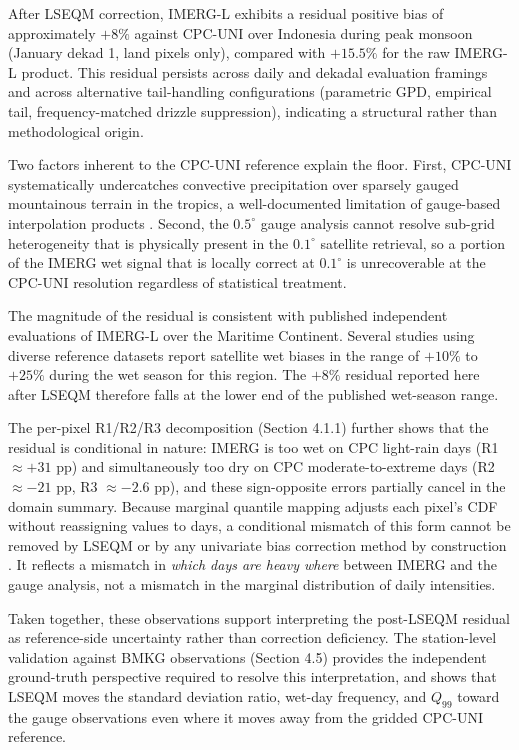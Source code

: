 \documentclass[
]{article}
\begin{document}
After LSEQM correction, IMERG-L exhibits a residual positive bias of
approximately \(+8\%\) against CPC-UNI over Indonesia during peak
monsoon (January dekad 1, land pixels only), compared with \(+15.5\%\)
for the raw IMERG-L product. This residual persists across daily and
dekadal evaluation framings and across alternative tail-handling
configurations (parametric GPD, empirical tail, frequency-matched
drizzle suppression), indicating a structural rather than methodological
origin.

Two factors inherent to the CPC-UNI reference explain the floor. First,
CPC-UNI systematically undercatches convective precipitation over
sparsely gauged mountainous terrain in the tropics, a well-documented
limitation of gauge-based interpolation products \cite{ref36,ref37}. Second,
the \(0.5^{\circ}\) gauge analysis cannot resolve sub-grid heterogeneity
that is physically present in the \(0.1^{\circ}\) satellite retrieval,
so a portion of the IMERG wet signal that is locally correct at
\(0.1^{\circ}\) is unrecoverable at the CPC-UNI resolution regardless of
statistical treatment.

The magnitude of the residual is consistent with published independent
evaluations of IMERG-L over the Maritime Continent. Several studies
using diverse reference datasets \cite{ref31,ref32,ref33,ref38,ref39,ref47} report
satellite wet biases in the range of \(+10\%\) to \(+25\%\) during the
wet season for this region. The \(+8\%\) residual reported here after
LSEQM therefore falls at the lower end of the published wet-season
range.

The per-pixel R1/R2/R3 decomposition (Section 4.1.1) further shows that
the residual is conditional in nature: IMERG is too wet on CPC
light-rain days (R1 \(\approx +31\) pp) and simultaneously too dry on
CPC moderate-to-extreme days (R2 \(\approx -21\) pp, R3 \(\approx -2.6\)
pp), and these sign-opposite errors partially cancel in the domain
summary. Because marginal quantile mapping adjusts each pixel's CDF
without reassigning values to days, a conditional mismatch of this form
cannot be removed by LSEQM or by any univariate bias correction method
by construction \cite{ref34,ref11}. It reflects a mismatch in \emph{which days
are heavy where} between IMERG and the gauge analysis, not a mismatch in
the marginal distribution of daily intensities.

Taken together, these observations support interpreting the post-LSEQM
residual as reference-side uncertainty rather than correction
deficiency. The station-level validation against BMKG observations
(Section 4.5) provides the independent ground-truth perspective required
to resolve this interpretation, and shows that LSEQM moves the standard
deviation ratio, wet-day frequency, and \(Q_{99}\) toward the gauge
observations even where it moves away from the gridded CPC-UNI
reference.
\end{document}
